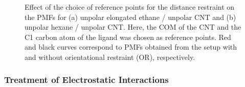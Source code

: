 \documentclass[9pt,lessons]{livecoms}
\begin{document}
\begin{figure}[htb!]
  \centering    
  \caption{
  Effect of the choice of reference points for the distance restraint on the PMFs for (a) unpolar elongated ethane / unpolar CNT and (b) unpolar hexane / unpolar CNT.
  Here, the COM of the CNT and the C1 carbon atom of the ligand was chosen as reference points.
  Red and black curves correspond to PMFs obtained from the setup with and without orientational restraint (OR), respectively.
  }
  \label{fig:refpoints}
\end{figure}

\subsubsection*{Treatment of Electrostatic Interactions}
\end{document}

